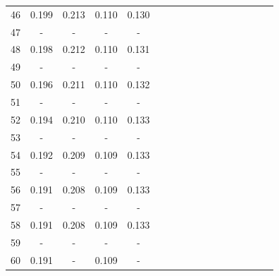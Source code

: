 \documentclass{report}
\begin{document}
\begin{table}
\begin{tabular}{|c|cccc|cccc|cccc|cccc|}
46 & 0.199 & 0.213 & 0.110 & 0.130 & & & & & & & & & & & &\\
47 &   -   &   -   &   -   &   -   & & & & & & & & & & & &\\
48 & 0.198 & 0.212 & 0.110 & 0.131 & & & & & & & & & & & &\\
49 &   -   &   -   &   -   &   -   & & & & & & & & & & & &\\
50 & 0.196 & 0.211 & 0.110 & 0.132 & & & & & & & & & & & &\\
51 &   -   &   -   &   -   &   -   & & & & & & & & & & & &\\
52 & 0.194 & 0.210 & 0.110 & 0.133 & & & & & & & & & & & &\\
53 &   -   &   -   &   -   &   -   & & & & & & & & & & & &\\
54 & 0.192 & 0.209 & 0.109 & 0.133 & & & & & & & & & & & &\\
55 &   -   &   -   &   -   &   -   & & & & & & & & & & & &\\
56 & 0.191 & 0.208 & 0.109 & 0.133 & & & & & & & & & & & &\\
57 &   -   &   -   &   -   &   -   & & & & & & & & & & & &\\
58 & 0.191 & 0.208 & 0.109 & 0.133 & & & & & & & & & & & &\\
59 &   -   &   -   &   -   &   -   & & & & & & & & & & & &\\
60 & 0.191 &   -   & 0.109 &   -   & & & & & & & & & & & &\\
\hline
\end{tabular}
\end{table}
\end{document}
